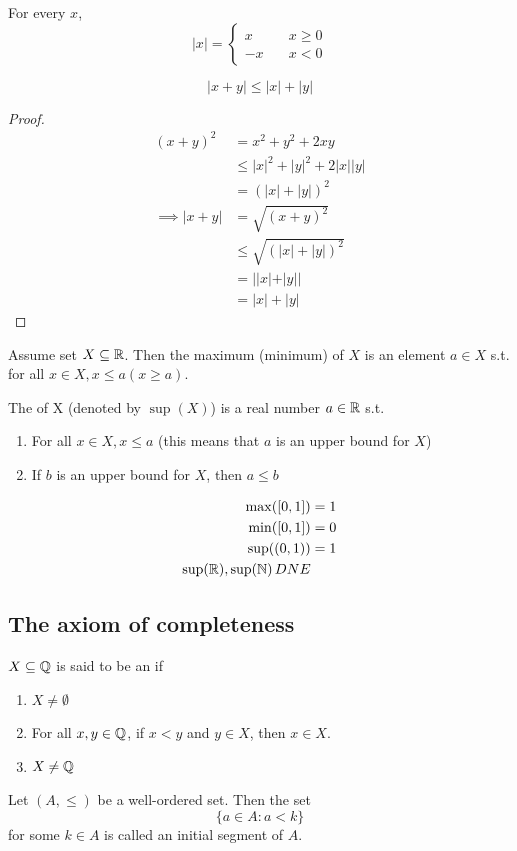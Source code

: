 \documentclass[11pt]{article}
\begin{document}
For every $x$, 
$$|x| = \begin{cases}
	x \quad & x \geq 0 \\
	-x \quad & x < 0
\end{cases}$$

$$|x+y| \leq |x| + |y|$$
\begin{proof}
	\begin{align*}
		(x + y)^2 &= x^2 + y^2 + 2xy \\
		&\leq |x|^2 + |y|^2 + 2|x||y| \\
		&= (|x| + |y|)^2 \\
		\implies |x + y| &= \sqrt{(x+y)^2}\\
		&\leq \sqrt{(|x| + |y|)^2} \\
		&= ||x| + |y||\\
		&= |x| + |y|
	\end{align*}
\end{proof}

Assume set $X \subseteq \mathbb{R}$. Then the maximum (minimum) of $X$ is an element $a \in X$ s.t. for all $x \in X, x \leq a (x \geq a)$.

The  of X (denoted by $\sup(X)$) is a real number $a \in \mathbb{R}$ s.t.

\begin{enumerate}
	\item For all $x \in X, x \leq a$ (this means that $a$ is an upper bound for $X$)
	\item If $b$ is an upper bound for $X$, then $a \leq b$
\end{enumerate}

\example
\begin{align*}
	\max([0, 1]) &= 1 \\
	\min([0, 1]) &= 0 \\
	\sup((0,1)) &= 1 \\
	\sup(\mathbb{R}), \sup(\mathbb{N}) \, DNE
\end{align*}
\subsection{The axiom of completeness}

$X \subseteq \mathbb{Q}$ is said to be an  if
\begin{enumerate}
	\item $X \neq \emptyset$
	\item For all $x, y \in \mathbb{Q}$, if $x < y$ and $y \in X$, then $x \in X$.
	\item $X \neq \mathbb{Q}$
\end{enumerate}
 Let $(A, \leq)$ be a well-ordered set. Then the set
$$\{a \in A: a < k\}$$ for some $k \in A$ is called an initial segment of $A$.
\end{document}
